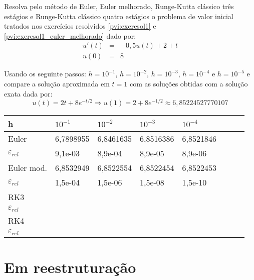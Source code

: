 \begin{exer}Resolva pelo método de Euler, Euler melhorado, Runge-Kutta clássico três estágios e Runge-Kutta clássico quatro estágios o problema de valor inicial tratados nos  exercícios resolvidos \ref{pvi:exeresol1} e \ref{pvi:exeresol1_euler_melhorado} dado por:
\begin{eqnarray}
     u'(t)&=& -0,5u(t)+2+t\\
            u(0) &=&  8
\end{eqnarray}

Usando os seguinte passos: $h=10^{-1}$, $h=10^{-2}$, $h=10^{-3}$, $h=10^{-4}$ e $h=10^{-5}$ e compare a solução aproximada em $t=1$ com as soluções obtidas com a solução exata dada por:
\begin{equation}
     u(t) = 2t+8e^{-t/2} \Longrightarrow u(1)=2+8e^{-1/2} \approx 6,85224527770107
\end{equation}
\end{exer}
\begin{resp} 
\begin{center}
 \begin{tabular}{|l|l|l|l|l|l|l|l|}%
\hline
   h&$10^{-1}$&$10^{-2}$&$10^{-3}$&$10^{-4}$\\
   \hline
   Euler & 6,7898955 &  6,8461635  &  6,8516386  &  6,8521846  \\
   \hline
   $\varepsilon_{rel}$ &9,1e-03 &  8,9e-04  & 8,9e-05&   8,9e-06 \\
   \hline
  Euler mod. & 6,8532949 &  6,8522554  &  6,8522454  &  6,8522453  \\
   \hline
   $\varepsilon_{rel}$ &1,5e-04 &  1,5e-06  & 1,5e-08&   1,5e-10 \\
   \hline
 RK3 & \\
   \hline
   $\varepsilon_{rel}$ &\\
 RK4 & \\
   \hline
    $\varepsilon_{rel}$ &\\
   \end{tabular}
\end{center}
\end{resp}


\chapter{Em reestruturação}




